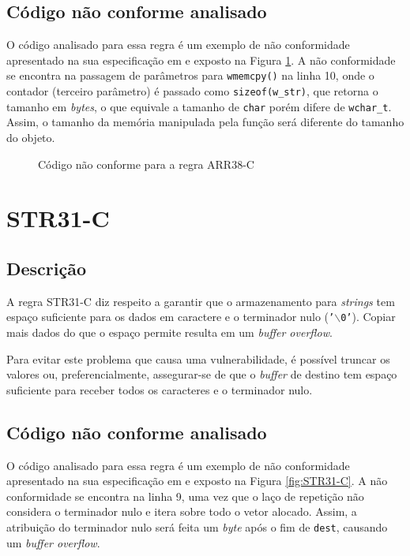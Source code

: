 \subsection{Código não conforme analisado}

O código analisado para essa regra é um exemplo de não conformidade apresentado na sua especificação em \cite{ccert} e exposto na Figura \ref{fig:ARR38-C}. A não conformidade se encontra na passagem de parâmetros para \texttt{wmemcpy()} na linha 10, onde o contador (terceiro parâmetro) é passado como \texttt{sizeof(w\_str)}, que retorna o tamanho em \textit{bytes}, o que equivale a tamanho de \texttt{char} porém difere de \texttt{wchar\_t}. Assim, o tamanho da memória manipulada pela função será diferente do tamanho do objeto.

\begin{figure}[h!]
  \centering
  
  \caption{Código não conforme para a regra ARR38-C}
\label{fig:ARR38-C}
\end{figure}

\section{STR31-C}
\subsection{Descrição}

A regra STR31-C diz respeito a garantir que o armazenamento para \textit{strings} tem espaço suficiente para os dados em caractere e o terminador nulo (\texttt{'$\backslash$0'}). Copiar mais dados do que o espaço permite resulta em um \textit{buffer overflow}.

Para evitar este problema que causa uma vulnerabilidade, é possível truncar os valores ou, preferencialmente, assegurar-se de que o \textit{buffer} de destino tem espaço suficiente para receber todos os caracteres e o terminador nulo.

\subsection{Código não conforme analisado}

O código analisado para essa regra é um exemplo de não conformidade apresentado na sua especificação em \cite{ccert} e exposto na Figura \ref{fig:STR31-C}. A não conformidade se encontra na linha 9, uma vez que o laço de repetição não considera o terminador nulo e itera sobre todo o vetor alocado. Assim, a atribuição do terminador nulo será feita um \textit{byte} após o fim de \texttt{dest}, causando um \textit{buffer overflow}.

